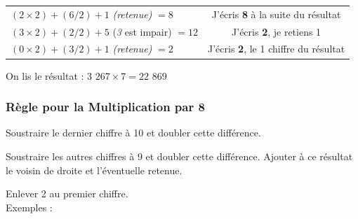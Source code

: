 \documentclass[a4paper]{article}
\begin{document}
\begin{small}
\begin{enumerate}
\begin{tabular}{l|c}
		$(2 \times 2) + (6 / 2) + 1$ \textit{(retenue)} $= 8$ & J'écris \textbf{8} à la suite du résultat
		
		\tabularnewline
		
		$(3 \times 2) + (2 / 2) + 5$ (\textit{3} est impair) $= 12$ & J'écris \textbf{2}, je retiens 1
		
		\tabularnewline
		
		$(0 \times 2) + (3 / 2) + 1$ \textit{(retenue)} $= 2$ & J'écris \textbf{2}, le 1\up{er} chiffre du résultat 
		
	\end{tabular}
	
	On lis le résultat : {\boldmath $3$ $267 \times 7 = 22$ $869$}\\

\end{enumerate}
\end{small}



\vfill
{\noindent \dotfill}



\subsubsection*{Règle pour la Multiplication par 8}

Soustraire le dernier chiffre à 10 et doubler cette différence.

Soustraire les autres chiffres à 9 et doubler cette différence. Ajouter à ce résultat le voisin de droite et l'éventuelle retenue.

Enlever 2 au premier chiffre.\\

{ \parindent=0.5cm Exemples : }
\end{document}
